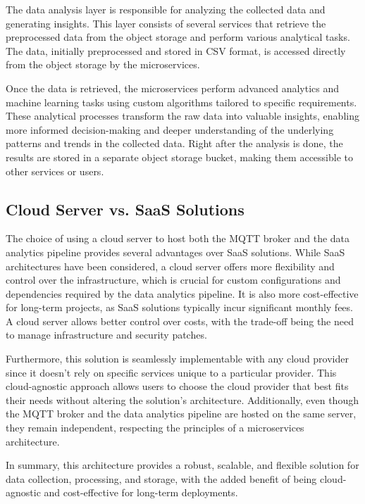 The data analysis layer is responsible for analyzing the collected data and generating insights. This layer consists of several services that retrieve the preprocessed data from the object storage and perform various analytical tasks. The data, initially preprocessed and stored in CSV format, is accessed directly from the object storage by the microservices.

Once the data is retrieved, the microservices perform advanced analytics and machine learning tasks using custom algorithms tailored to specific requirements. These analytical processes transform the raw data into valuable insights, enabling more informed decision-making and deeper understanding of the underlying patterns and trends in the collected data.
Right after the analysis is done, the results are stored in a separate object storage bucket, making them accessible to other services or users.

\subsection{Cloud Server vs. SaaS Solutions}

The choice of using a cloud server to host both the MQTT broker and the data analytics pipeline provides several advantages over SaaS solutions. While SaaS architectures have been considered, a cloud server offers more flexibility and control over the infrastructure, which is crucial for custom configurations and dependencies required by the data analytics pipeline. It is also more cost-effective for long-term projects, as SaaS solutions typically incur significant monthly fees. A cloud server allows better control over costs, with the trade-off being the need to manage infrastructure and security patches.

Furthermore, this solution is seamlessly implementable with any cloud provider since it doesn't rely on specific services unique to a particular provider. This cloud-agnostic approach allows users to choose the cloud provider that best fits their needs without altering the solution's architecture. Additionally, even though the MQTT broker and the data analytics pipeline are hosted on the same server, they remain independent, respecting the principles of a microservices architecture.

In summary, this architecture provides a robust, scalable, and flexible solution for data collection, processing, and storage, with the added benefit of being cloud-agnostic and cost-effective for long-term deployments.

